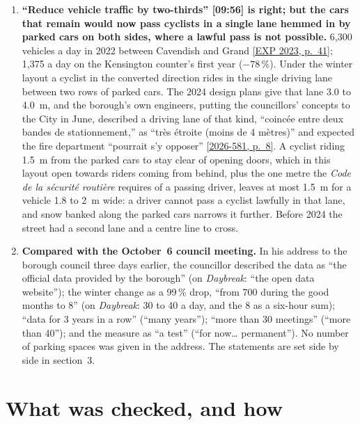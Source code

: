 \documentclass[11pt,letterpaper]{article}
\newcommand{\repourl}{https://github.com/OpenMobilityData/Terrebonne-open-sources}
\newcommand{\pagesurl}{https://openmobilitydata.github.io/Terrebonne-access-requests}
\newcommand{\cliptime}[1]{\textsf{\small[#1]}}
\newcommand{\pgl}[2]{\href{\pagesurl/2026-581/raw/01_emails_mandate_counts.pdf\#page=#1}{\textsf{\small[2026-581, p.~#2]}}}
\newcommand{\pg}[1]{\pgl{#1}{#1}}
\newcommand{\exppg}[1]{\href{\repourl/blob/main/2023-exp-mobility-study/raw/EXP_Etude_de_mobilite_rue_de_Terrebonne_2023.pdf}{\textsf{\small[EXP 2023, p.~#1]}}}
\begin{document}
\begin{enumerate}[nosep]
  \item \begin{minipage}[t]{\linewidth}\textbf{``Reduce vehicle traffic by two-thirds'' \cliptime{09:56} is right; but the cars that remain would now pass cyclists in a single lane hemmed in by parked cars on both sides, where a lawful pass is not possible.} 6{,}300 vehicles a day in 2022 between Cavendish and Grand \exppg{41}; 1{,}375 a day on the Kensington counter's first year ($-78$\,\%). Under the winter layout a cyclist in the converted direction rides in the single driving lane between two rows of parked cars. The 2024 design plans give that lane 3.0 to 4.0~m, and the borough's own engineers, putting the councillors' concepts to the City in June, described a driving lane of that kind, ``coincée entre deux bandes de stationnement,'' as ``très étroite (moins de 4 mètres)'' and expected the fire department ``pourrait s'y opposer'' \pg{8}. A cyclist riding 1.5~m from the parked cars to stay clear of opening doors, which in this layout open towards riders coming from behind, plus the one metre the \emph{Code de la sécurité routière} requires of a passing driver, leaves at most 1.5~m for a vehicle 1.8 to 2~m wide: a driver cannot pass a cyclist lawfully in that lane, and snow banked along the parked cars narrows it further. Before 2024 the street had a second lane and a centre line to cross.\end{minipage}\vspace{0.35em}
  \item \begin{minipage}[t]{\linewidth}\textbf{Compared with the October~6 council meeting.} In his address to the borough council three days earlier, the councillor described the data as ``the official data provided by the borough'' (on \emph{Daybreak}: ``the open data website''); the winter change as a 99\,\% drop, ``from 700 during the good months to 8'' (on \emph{Daybreak}: 30 to 40 a day, and the 8 as a six-hour sum); ``data for 3 years in a row'' (``many years''); ``more than 30 meetings'' (``more than 40''); and the measure as ``a test'' (``for now… permanent''). No number of parking spaces was given in the address. The statements are set side by side in section~3.\end{minipage}\vspace{0.35em}
\end{enumerate}

\section{What was checked, and how}
\end{document}
